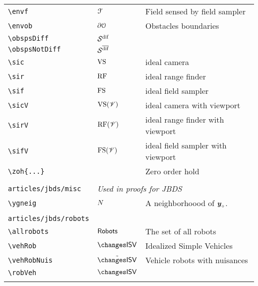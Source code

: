 \begin{longtable}{lll}
 {\color[rgb]{0.5,0.5,0.5}\texttt{\textbackslash envf}} & $\mathcal{F}$ &  Field sensed by field sampler\\ 
 {\color[rgb]{0.5,0.5,0.5}\texttt{\textbackslash envob}} & $\partial \mathcal{O}$ &  Obstacles boundaries\\ 
 {\color[rgb]{0.5,0.5,0.5}\texttt{\textbackslash obspsDiff}} & $\obspsDiff$ & \\ 
 {\color[rgb]{0.5,0.5,0.5}\texttt{\textbackslash obspsNotDiff}} & $\obspsNotDiff$ & \\ 
 {\color[rgb]{0.5,0.5,0.5}\texttt{\textbackslash sic}} & $\text{VS}$ &  ideal camera\\ 
 {\color[rgb]{0.5,0.5,0.5}\texttt{\textbackslash sir}} & $\text{RF}$ &  ideal range finder\\ 
 {\color[rgb]{0.5,0.5,0.5}\texttt{\textbackslash sif}} & $\text{FS}$ &  ideal field sampler\\ 
 {\color[rgb]{0.5,0.5,0.5}\texttt{\textbackslash sicV}} & $\text{VS}(\mathscr{V})$ &  ideal camera with viewport\\ 
 {\color[rgb]{0.5,0.5,0.5}\texttt{\textbackslash sirV}} & $\text{RF}(\mathscr{V})$ &  ideal range finder with viewport\\ 
 {\color[rgb]{0.5,0.5,0.5}\texttt{\textbackslash sifV}} & $\text{FS}(\mathscr{V})$ &  ideal field sampler with viewport\\ 
 {\color[rgb]{0.5,0.5,0.5}\texttt{\textbackslash zoh\{...\}}} &  &  Zero order hold\\ 
  &  & \\ 
 {\color[rgb]{0.5,0.5,0.5}\texttt{articles/jbds/misc}} & \multicolumn{2}{l}{\emph{Used in proofs for JBDS}}\\ 
 \hline
{\color[rgb]{0.5,0.5,0.5}\texttt{\textbackslash ygneig}} & $N$ &  A neighborhoood of $\boldsymbol{y}_{\circ}$.\\ 
  &  & \\ 
 {\color[rgb]{0.5,0.5,0.5}\texttt{articles/jbds/robots}} & \multicolumn{2}{l}{\emph{}}\\ 
 \hline
{\color[rgb]{0.5,0.5,0.5}\texttt{\textbackslash allrobots}} & $\mathsf{Robots}$ &  The set of all robots\\ 
 {\color[rgb]{0.5,0.5,0.5}\texttt{\textbackslash vehRob}} & $\vehRob$ &  Idealized Simple Vehicles\\ 
 {\color[rgb]{0.5,0.5,0.5}\texttt{\textbackslash vehRobNuis}} & $\vehRobNuis$ &  Vehicle robots with nuisances\\ 
 {\color[rgb]{0.5,0.5,0.5}\texttt{\textbackslash robVeh}} & $\robVeh$ & \\ 
  &  & \\ 

\end{longtable}
